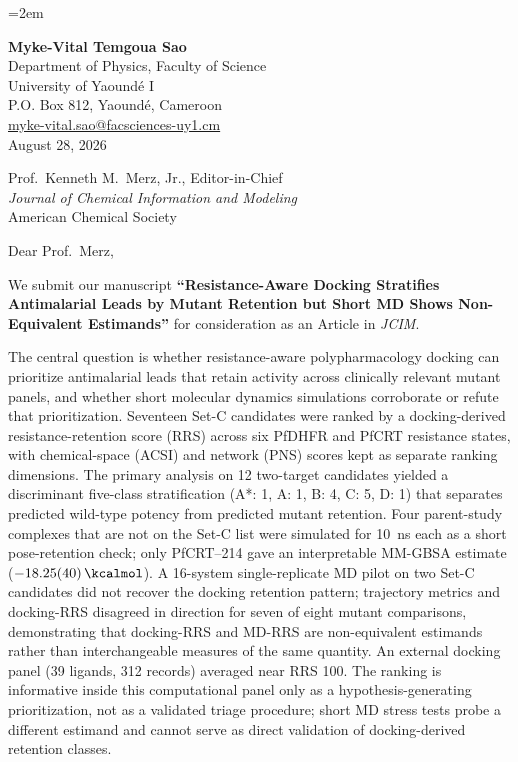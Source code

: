 \documentclass[11pt,letterpaper]{article}
\begin{document}
\emergencystretch=2em

\begin{flushleft}
\textbf{Myke-Vital Temgoua Sao} \\
Department of Physics, Faculty of Science \\
University of Yaound\'{e} I \\
P.O. Box 812, Yaound\'{e}, Cameroon \\
\href{mailto:myke-vital.sao@facsciences-uy1.cm}{myke-vital.sao@facsciences-uy1.cm} \\[1.5em]
August 28, 2026
\end{flushleft}

\begin{flushleft}
Prof.\ Kenneth M.\ Merz, Jr., Editor-in-Chief \\
\textit{Journal of Chemical Information and Modeling} \\
American Chemical Society
\end{flushleft}

\vspace{0.5em}

\noindent Dear Prof.\ Merz,

We submit our manuscript \textbf{``Resistance-Aware Docking Stratifies Antimalarial Leads by Mutant Retention but Short MD Shows Non-Equivalent Estimands''} for consideration as an Article in \textit{JCIM}.

The central question is whether resistance-aware polypharmacology docking can prioritize antimalarial leads that retain activity across clinically relevant mutant panels, and whether short molecular dynamics simulations corroborate or refute that prioritization. Seventeen Set-C candidates were ranked by a docking-derived resistance-retention score (RRS) across six PfDHFR and PfCRT resistance states, with chemical-space (ACSI) and network (PNS) scores kept as separate ranking dimensions. The primary analysis on 12 two-target candidates yielded a discriminant five-class stratification (A*: 1, A: 1, B: 4, C: 5, D: 1) that separates predicted wild-type potency from predicted mutant retention. Four parent-study complexes that are not on the Set-C list were simulated for \qty{10}{\nano\second} each as a short pose-retention check; only PfCRT--214 gave an interpretable MM-GBSA estimate ($\qty{-18.25 \pm 0.40}{\kcalmol}$). A 16-system single-replicate MD pilot on two Set-C candidates did not recover the docking retention pattern; trajectory metrics and docking-RRS disagreed in direction for seven of eight mutant comparisons, demonstrating that docking-RRS and MD-RRS are non-equivalent estimands rather than interchangeable measures of the same quantity. An external docking panel (39 ligands, 312 records) averaged near RRS 100. The ranking is informative inside this computational panel only as a hypothesis-generating prioritization, not as a validated triage procedure; short MD stress tests probe a different estimand and cannot serve as direct validation of docking-derived retention classes.
\end{document}
